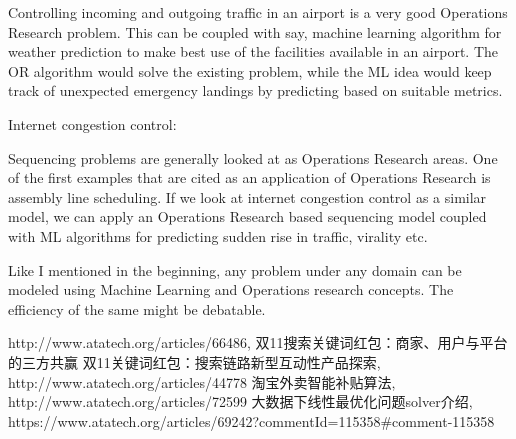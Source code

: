 Controlling incoming and outgoing traffic in an airport is a very good Operations Research problem. This can be coupled with say, machine learning algorithm for weather prediction to make best use of the facilities available in an airport. The OR algorithm would solve the existing problem, while the ML idea would keep track of unexpected emergency landings by predicting based on suitable metrics.


Internet congestion control:

Sequencing problems are generally looked at as Operations Research areas. One of the first examples that are cited as an application of Operations Research is assembly line scheduling. If we look at internet congestion control as a similar model, we can apply an Operations Research based sequencing model coupled with ML algorithms for predicting sudden rise in traffic, virality etc.

Like I mentioned in the beginning, any problem under any domain can be modeled using Machine Learning and Operations research concepts. The efficiency of the same might be debatable.




\begin{thebibliography}{99}
 http://www.atatech.org/articles/66486, 双11搜索关键词红包：商家、用户与平台的三方共赢
 双11关键词红包：搜索链路新型互动性产品探索, http://www.atatech.org/articles/44778
 淘宝外卖智能补贴算法, http://www.atatech.org/articles/72599 
 大数据下线性最优化问题solver介绍, https://www.atatech.org/articles/69242?commentId=115358#comment-115358

\end{thebibliography}

 
